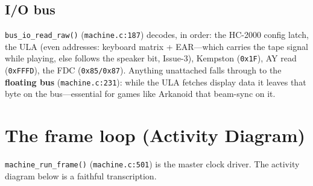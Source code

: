 \documentclass[11pt,a4paper]{article}
\begin{document}
\subsection{I/O bus}
\texttt{bus\_io\_read\_raw()} (\texttt{machine.c:187}) decodes, in order: the
HC-2000 config latch, the ULA (even addresses: keyboard matrix + EAR---which
carries the tape signal while playing, else follows the speaker bit, Issue-3),
Kempston (\texttt{0x1F}), AY read (\texttt{0xFFFD}), the FDC
(\texttt{0x85/0x87}). Anything unattached falls through to the
\textbf{floating bus} (\texttt{machine.c:231}): while the ULA fetches display
data it leaves that byte on the bus---essential for games like Arkanoid that
beam-sync on it.

\section{The frame loop (Activity Diagram)}

\texttt{machine\_run\_frame()} (\texttt{machine.c:501}) is the master clock
driver. The activity diagram below is a faithful transcription.
\end{document}
